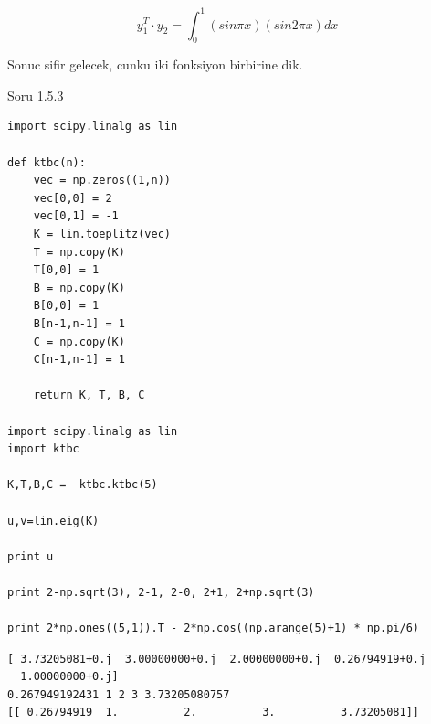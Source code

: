 \documentclass[12pt,fleqn]{article}\usepackage{../common}
\begin{document}
\[ y_1^T \cdot y_2  = \int_0^1 (sin \pi x)(sin 2\pi x)dx  \]

Sonuc sifir gelecek, cunku iki fonksiyon birbirine dik.

Soru 1.5.3

\begin{verbatim}
import scipy.linalg as lin

def ktbc(n):
    vec = np.zeros((1,n))
    vec[0,0] = 2
    vec[0,1] = -1
    K = lin.toeplitz(vec)
    T = np.copy(K)
    T[0,0] = 1
    B = np.copy(K)
    B[0,0] = 1
    B[n-1,n-1] = 1
    C = np.copy(K)
    C[n-1,n-1] = 1
    
    return K, T, B, C

import scipy.linalg as lin
import ktbc

K,T,B,C =  ktbc.ktbc(5)

u,v=lin.eig(K)

print u

print 2-np.sqrt(3), 2-1, 2-0, 2+1, 2+np.sqrt(3)

print 2*np.ones((5,1)).T - 2*np.cos((np.arange(5)+1) * np.pi/6)
\end{verbatim}

\begin{verbatim}
[ 3.73205081+0.j  3.00000000+0.j  2.00000000+0.j  0.26794919+0.j
  1.00000000+0.j]
0.267949192431 1 2 3 3.73205080757
[[ 0.26794919  1.          2.          3.          3.73205081]]
\end{verbatim}
\end{document}

